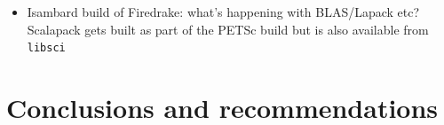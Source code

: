 \documentclass[a4paper,titlepage]{article}
\begin{document}
\begin{itemize}
\item Isambard build of Firedrake: what's happening with BLAS/Lapack etc? Scalapack gets built as part of the PETSc build but is also available from \texttt{libsci}
\end{itemize}



\section{Conclusions and recommendations}

\end{document}
